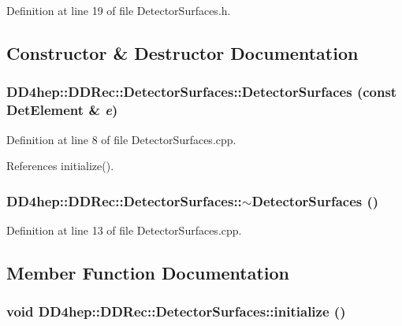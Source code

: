 Definition at line 19 of file DetectorSurfaces.h.

\subsection{Constructor \& Destructor Documentation}
\hypertarget{class_d_d4hep_1_1_d_d_rec_1_1_detector_surfaces_a58d3e7043a5f76b37f9cf042f79b2cc1}{
\subsubsection[{DetectorSurfaces}]{\setlength{\rightskip}{0pt plus 5cm}DD4hep::DDRec::DetectorSurfaces::DetectorSurfaces (const {\bf DetElement} \& {\em e})}}
\label{class_d_d4hep_1_1_d_d_rec_1_1_detector_surfaces_a58d3e7043a5f76b37f9cf042f79b2cc1}


Definition at line 8 of file DetectorSurfaces.cpp.

References initialize().\hypertarget{class_d_d4hep_1_1_d_d_rec_1_1_detector_surfaces_aa0ef16856472dab841a659a97386acd0}{
\subsubsection[{$\sim$DetectorSurfaces}]{\setlength{\rightskip}{0pt plus 5cm}DD4hep::DDRec::DetectorSurfaces::$\sim$DetectorSurfaces ()}}
\label{class_d_d4hep_1_1_d_d_rec_1_1_detector_surfaces_aa0ef16856472dab841a659a97386acd0}


Definition at line 13 of file DetectorSurfaces.cpp.

\subsection{Member Function Documentation}
\hypertarget{class_d_d4hep_1_1_d_d_rec_1_1_detector_surfaces_a7db2dd282079291d6c99275db180fd81}{
\subsubsection[{initialize}]{\setlength{\rightskip}{0pt plus 5cm}void DD4hep::DDRec::DetectorSurfaces::initialize ()}}
\label{class_d_d4hep_1_1_d_d_rec_1_1_detector_surfaces_a7db2dd282079291d6c99275db180fd81}


